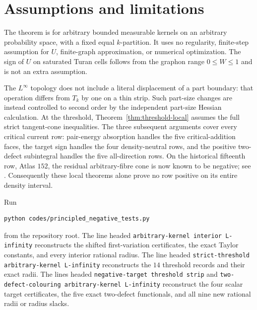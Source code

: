 \documentclass[11pt]{article}
\begin{document}
\section{Assumptions and limitations}

The theorem is for arbitrary bounded measurable kernels on an arbitrary
probability space, with a fixed equal $k$-partition.  It uses no regularity,
finite-step assumption for $U$, finite-graph approximation, or numerical
optimization.  The sign of $U$ on saturated Turan cells follows from the
graphon range $0\leq W\leq1$ and is not an extra assumption.

The $L^\infty$ topology does not include a literal displacement of a part
boundary: that operation differs from $T_k$ by one on a thin strip.  Such
part-size changes are instead controlled to second order by the independent
part-size Hessian calculation.  At the threshold,
Theorem~\ref{thm:threshold-local} assumes the full strict tangent-cone
inequalities.  The three subsequent arguments cover every critical current
row: pair-energy absorption handles the five critical-addition faces, the
target sign handles the four density-neutral rows, and the positive
two-defect subintegral handles the five all-direction rows.  On the
historical fifteenth row, Atlas $152$,
the residual arbitrary-fibre cone is now known to be negative; see
.  Consequently
these local theorems alone prove no row positive on its entire density
interval.

Run
\begin{verbatim}
python codes/principled_negative_tests.py
\end{verbatim}
from the repository root.  The line headed
\texttt{arbitrary-kernel interior L-infinity} reconstructs the shifted
first-variation certificates, the exact Taylor constants, and every interior
rational radius.  The line headed
\texttt{strict-threshold arbitrary-kernel L-infinity} reconstructs the $14$
threshold records and their exact radii.  The lines headed
\texttt{negative-target threshold strip} and
\texttt{two-defect-colouring arbitrary-kernel L-infinity} reconstruct the
four scalar target certificates, the five exact two-defect functionals, and
all nine new rational radii or radius slacks.
\end{document}
